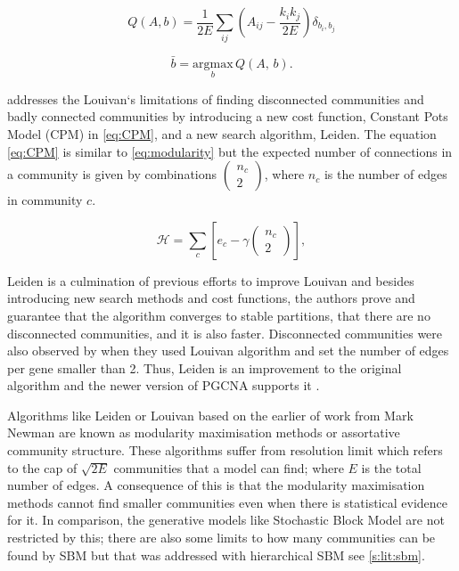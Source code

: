 \begin{equation} \label{eq:mod_max_cost}
    Q(A,b) = \frac{1}{2E} \sum_{ij} \left( A_{ij} - \frac{k_i k_j}{2E} \right) \delta_{b_i, b_j}
\end{equation}

\begin{equation} \label{eq:mod_max_per_com}
    \bar{b} = \underset{b}{\mathrm{argmax}} \, Q(A, \, b).
\end{equation}

\citet{Traag2019-ne} addresses the Louivan`s limitations of finding disconnected communities and badly connected communities by introducing a new cost function, Constant Pots Model (CPM) in \cref{eq:CPM}, and a new search algorithm, Leiden. The equation \cref{eq:CPM} is similar to \cref{eq:modularity} but the expected number of connections in a community is given by combinations $(\begin{array}{c}{n}_{c}\\ 2\end{array})$, where $n_c$ is the number of edges in community $c$.

\begin{equation} \label{eq:CPM}
    {\mathcal H} ={\sum }_{c}[{e}_{c}-\gamma (\begin{array}{c}{n}_{c}\\ 2\end{array})],
\end{equation}

Leiden is a culmination of previous efforts to improve Louivan \citep{Ozaki2016-dl, Waltman2013-zw, Bae2017-rz, Traag2015-tq} and besides introducing new search methods and cost functions, the authors prove and guarantee that the algorithm converges to stable partitions, that there are no disconnected communities, and it is also faster. Disconnected communities were also observed by \citet{Care2019-ij} when they used Louivan algorithm and set the number of edges per gene smaller than 2. Thus, Leiden is an improvement to the original algorithm and the newer version of PGCNA supports it \citep{Care2019-ij} .

Algorithms like Leiden or Louivan based on the earlier of work from Mark Newman \citep{Newman2004-dd, Newman2006-dn} are known as modularity maximisation methods or assortative community structure. These algorithms suffer from resolution limit \citep{Fortunato2007-gh, Peixoto2023-se} which refers to the cap of $\sqrt{2E}$ communities that a model can find; where $E$ is the total number of edges. A consequence of this is that the modularity maximisation methods cannot find smaller communities even when there is statistical evidence for it. In comparison, the generative models like Stochastic Block Model are not restricted by this; there are also some limits to how many communities can be found by SBM but that was addressed with hierarchical SBM see \cref{s:lit:sbm}.

